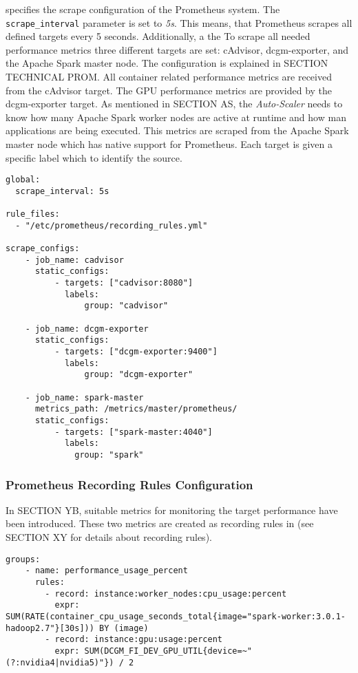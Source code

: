  specifies the scrape configuration of the Prometheus system.
The \texttt{scrape\_interval} parameter is set to \textit{5s}. This means, that Prometheus scrapes all defined targets every 5 seconds.
% 
Additionally, a the 
To scrape all needed performance metrics three different targets are set: cAdvisor, dcgm-exporter, and the Apache Spark master node. The configuration is explained in SECTION TECHNICAL PROM.
All container related performance metrics are received from the cAdvisor target. The GPU performance metrics are provided by the dcgm-exporter target. As mentioned in SECTION AS, the \textit{Auto-Scaler} needs to know how many Apache Spark worker nodes are active at runtime and how man applications are being executed. This metrics are scraped from the Apache Spark master node which has native support for Prometheus.
Each target is given a specific label which to identify the source.
\begin{lstlisting}[label=lst:06_computing_am_prom-config, caption=Prometheus target configuration in YAML syntax]
global:
  scrape_interval: 5s
 
rule_files:
  - "/etc/prometheus/recording_rules.yml"
 
scrape_configs:
    - job_name: cadvisor
      static_configs:
          - targets: ["cadvisor:8080"]
            labels:
                group: "cadvisor"
 
    - job_name: dcgm-exporter
      static_configs:
          - targets: ["dcgm-exporter:9400"]
            labels:
                group: "dcgm-exporter"
    
    - job_name: spark-master
      metrics_path: /metrics/master/prometheus/
      static_configs:
          - targets: ["spark-master:4040"]
            labels:
              group: "spark"
\end{lstlisting}


\subsubsection{Prometheus Recording Rules Configuration}
In SECTION YB, suitable metrics for monitoring the target performance have been introduced.
%
These two metrics are created as recording rules in   (see SECTION XY for details about recording rules).
%
\begin{lstlisting}[label=lst:06_env_depl_am_prom-rules, caption=Prometheus target configuration in YAML syntax]
groups:
    - name: performance_usage_percent
      rules:
        - record: instance:worker_nodes:cpu_usage:percent
          expr: SUM(RATE(container_cpu_usage_seconds_total{image="spark-worker:3.0.1-hadoop2.7"}[30s])) BY (image)
        - record: instance:gpu:usage:percent
          expr: SUM(DCGM_FI_DEV_GPU_UTIL{device=~"(?:nvidia4|nvidia5)"}) / 2
\end{lstlisting}


